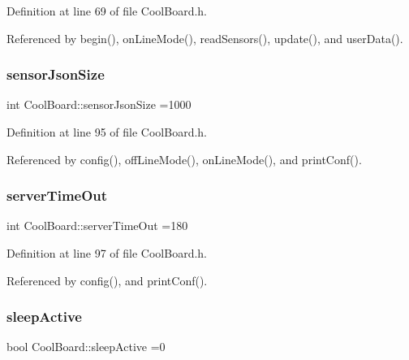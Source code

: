 Definition at line 69 of file Cool\+Board.\+h.



Referenced by begin(), on\+Line\+Mode(), read\+Sensors(), update(), and user\+Data().

\mbox{\label{classCoolBoard_a58e4b6072e3ac8b141ec0befb479208e}} 
\subsubsection{\texorpdfstring{sensor\+Json\+Size}{sensorJsonSize}}
{\footnotesize\ttfamily int Cool\+Board\+::sensor\+Json\+Size =1000\hspace{0.3cm}{\ttfamily [private]}}



Definition at line 95 of file Cool\+Board.\+h.



Referenced by config(), off\+Line\+Mode(), on\+Line\+Mode(), and print\+Conf().

\mbox{\label{classCoolBoard_a7a8d8d3d316220cdd049cd63c1aa8fe6}} 
\subsubsection{\texorpdfstring{server\+Time\+Out}{serverTimeOut}}
{\footnotesize\ttfamily int Cool\+Board\+::server\+Time\+Out =180\hspace{0.3cm}{\ttfamily [private]}}



Definition at line 97 of file Cool\+Board.\+h.



Referenced by config(), and print\+Conf().

\mbox{\label{classCoolBoard_a0a51b2287139f66c738101fb53139230}} 
\subsubsection{\texorpdfstring{sleep\+Active}{sleepActive}}
{\footnotesize\ttfamily bool Cool\+Board\+::sleep\+Active =0\hspace{0.3cm}{\ttfamily [private]}}



